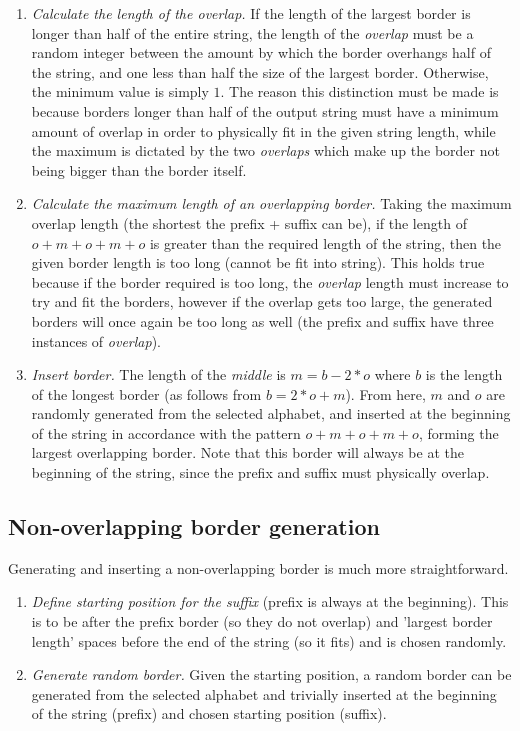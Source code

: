 \documentclass{l4proj}
\begin{document}
\begin{enumerate}[i]
	\item
	\emph{Calculate the length of the overlap.} If the length of the largest border is longer than half of the entire string, the length of the \emph{overlap} must be a random integer between the amount by which the border overhangs half of the string, and one less than half the size of the largest border. Otherwise, the minimum value is simply $1$. The reason this distinction must be made is because borders longer than half of the output string must have a minimum amount of overlap in order to physically fit in the given string length, while the maximum is dictated by the two \emph{overlaps} which make up the border not being bigger than the border itself.

	\item
	 \emph{Calculate the maximum length of an overlapping border.} Taking the maximum overlap length (the shortest the prefix + suffix can be), if the length of $o+m+o+m+o$ is greater than the required length of the string, then the given border length is too long (cannot be fit into string). This holds true because if the border required is too long, the \emph{overlap} length must increase to try and fit the borders, however if the overlap gets too large, the generated borders will once again be too long as well (the prefix and suffix have three instances of \emph{overlap}).

\item
\emph{Insert border.} The length of the \emph{middle} is $m = b - 2 * o$ where $b$ is the length of the longest border (as follows from $b = 2 * o + m$). From here, $m$ and $o$ are randomly generated from the selected alphabet, and inserted at the beginning of the string in accordance with the pattern $o+m+o+m+o$, forming the largest overlapping border. Note that this border will always be at the beginning of the string, since the prefix and suffix must physically overlap.
\end{enumerate}

\subsection{Non-overlapping border generation}
\label{sec:nob}

Generating and inserting a non-overlapping border is much more straightforward. 
\begin{enumerate}[i]
	\item
	\emph{Define starting position for the suffix} (prefix is always at the beginning). This is to be after the prefix border (so they do not overlap) and 'largest border length' spaces before the end of the string (so it fits) and is chosen randomly. 
	\item
	\emph{Generate random border.} Given the starting position, a random border can be generated from the selected alphabet and trivially inserted at the beginning of the string (prefix) and chosen starting position (suffix). 
\end{enumerate}
\end{document}
